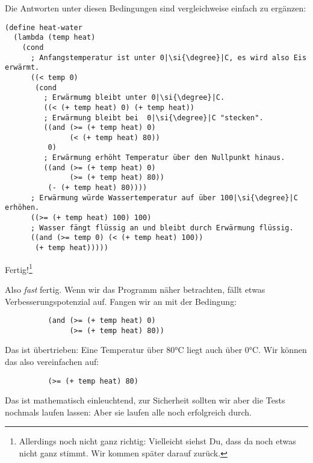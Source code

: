 %
Die Antworten unter diesen Bedingungen sind vergleichweise einfach zu
ergänzen:
%
\begin{lstlisting}
(define heat-water
  (lambda (temp heat)
    (cond
      ; Anfangstemperatur ist unter 0|\si{\degree}|C, es wird also Eis erwärmt.
      ((< temp 0)
       (cond
         ; Erwärmumg bleibt unter 0|\si{\degree}|C.
         ((< (+ temp heat) 0) (+ temp heat))
         ; Erwärmung bleibt bei  0|\si{\degree}|C "stecken".
         ((and (>= (+ temp heat) 0)
               (< (+ temp heat) 80))
          0)
         ; Erwärmung erhöht Temperatur über den Nullpunkt hinaus.
         ((and (>= (+ temp heat) 0)
               (>= (+ temp heat) 80))
          (- (+ temp heat) 80))))
      ; Erwärmung würde Wassertemperatur auf über 100|\si{\degree}|C erhöhen.
      ((>= (+ temp heat) 100) 100)
      ; Wasser fängt flüssig an und bleibt durch Erwärmung flüssig.
      ((and (>= temp 0) (< (+ temp heat) 100))
       (+ temp heat)))))
\end{lstlisting}
%
Fertig!\footnote{Allerdings noch nicht ganz richtig: Vielleicht siehst Du,
  dass da noch etwas nicht ganz stimmt.  Wir kommen später darauf zurück.}

\medskip

Also \emph{fast} fertig.  Wenn wir das Programm näher betrachten,
fällt etwas Verbesserungspotenzial auf.  Fangen wir an mit der
Bedingung:
%
\begin{lstlisting}
          (and (>= (+ temp heat) 0)
               (>= (+ temp heat) 80))
\end{lstlisting}
%
Das ist übertrieben: Eine Temperatur über 80\si{\degree}C liegt auch über 0\si{\degree}C.
Wir können das also vereinfachen auf:
%
\begin{lstlisting}
          (>= (+ temp heat) 80)
\end{lstlisting}
%
Das ist mathematisch einleuchtend, zur Sicherheit sollten wir aber die
Tests nochmals laufen lassen: Aber sie laufen alle noch erfolgreich
durch.

